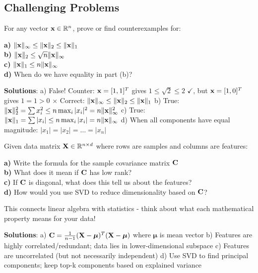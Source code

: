 \documentclass{article}
\newcounter{example}
\newcounter{exercise}
\begin{document}
\subsection{Challenging Problems}

\begin{tcolorbox}[colback=gray!5!white,colframe=gray!75!black,title=Problem \stepcounter{exercise}\#\theexercise: Norm Relationships]
For any vector $\mathbf{x} \in \mathbb{R}^n$, prove or find counterexamples for:

\textbf{a)} $\|\mathbf{x}\|_\infty \leq \|\mathbf{x}\|_2 \leq \|\mathbf{x}\|_1$\\
\textbf{b)} $\|\mathbf{x}\|_2 \leq \sqrt{n} \|\mathbf{x}\|_\infty$\\
\textbf{c)} $\|\mathbf{x}\|_1 \leq n \|\mathbf{x}\|_\infty$\\
\textbf{d)} When do we have equality in part (b)?

\textbf{Solutions}:
a) False! Counter: $\mathbf{x} = [1, 1]^T$ gives $1 \leq \sqrt{2} \leq 2$ $\checkmark$, but $\mathbf{x} = [1, 0]^T$ gives $1 = 1 > 0$ $\times$
Correct: $\|\mathbf{x}\|_\infty \leq \|\mathbf{x}\|_2 \leq \|\mathbf{x}\|_1$
b) True: $\|\mathbf{x}\|_2^2 = \sum x_i^2 \leq n \max_i |x_i|^2 = n \|\mathbf{x}\|_\infty^2$
c) True: $\|\mathbf{x}\|_1 = \sum |x_i| \leq n \max_i |x_i| = n \|\mathbf{x}\|_\infty$
d) When all components have equal magnitude: $|x_1| = |x_2| = \ldots = |x_n|$
\end{tcolorbox}

\begin{tcolorbox}[colback=gray!5!white,colframe=gray!75!black,title=Problem \stepcounter{exercise}\#\theexercise: Covariance Matrix Analysis]
Given data matrix $\mathbf{X} \in \mathbb{R}^{n \times d}$ where rows are samples and columns are features:

\textbf{a)} Write the formula for the sample covariance matrix $\mathbf{C}$\\
\textbf{b)} What does it mean if $\mathbf{C}$ has low rank?\\
\textbf{c)} If $\mathbf{C}$ is diagonal, what does this tell us about the features?\\
\textbf{d)} How would you use SVD to reduce dimensionality based on $\mathbf{C}$?

This connects linear algebra with statistics - think about what each mathematical property means for your data!

\textbf{Solutions}:
a) $\mathbf{C} = \frac{1}{n-1}(\mathbf{X} - \boldsymbol{\mu})^T(\mathbf{X} - \boldsymbol{\mu})$ where $\boldsymbol{\mu}$ is mean vector
b) Features are highly correlated/redundant; data lies in lower-dimensional subspace
c) Features are uncorrelated (but not necessarily independent)
d) Use SVD to find principal components; keep top-k components based on explained variance
\end{tcolorbox}
\end{document}
